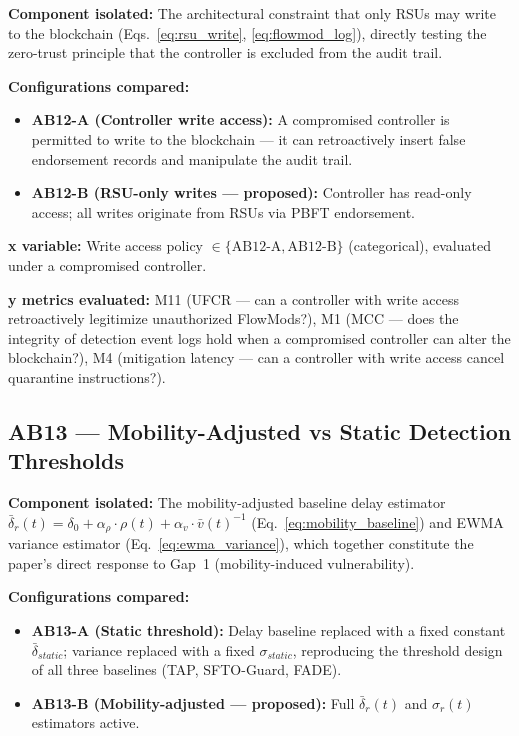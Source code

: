 \documentclass[12pt, a4paper]{report}
\begin{document}
{{\textbf{Component isolated:}
The architectural constraint that only \ac{RSU}s
may write to the blockchain
(Eqs.~\ref{eq:rsu_write}, \ref{eq:flowmod_log}),
directly testing the zero-trust principle that the
controller is excluded from the audit trail.

\textbf{Configurations compared:}
\begin{itemize}
    \item \textbf{AB12-A (Controller write access):}
    A compromised controller is permitted to write
    to the blockchain — it can retroactively insert
    false endorsement records and manipulate the
    audit trail.
    \item \textbf{AB12-B (RSU-only writes —
    proposed):} Controller has read-only access;
    all writes originate from \ac{RSU}s via
    \ac{PBFT} endorsement.
\end{itemize}

\textbf{x variable:} Write access policy
$\in \{\text{AB12-A}, \text{AB12-B}\}$ (categorical),
evaluated under a compromised controller.

\textbf{y metrics evaluated:} M11 (UFCR — can a
controller with write access retroactively legitimize
unauthorized FlowMods?), M1 (MCC — does the integrity
of detection event logs hold when a compromised
controller can alter the blockchain?), M4 (mitigation
latency — can a controller with write access cancel
quarantine instructions?).


\subsection{AB13 — Mobility-Adjusted vs Static
Detection Thresholds}
\label{sec:ab13}

\textbf{Component isolated:}
The mobility-adjusted baseline delay estimator
$\bar{\delta}_r(t) = \delta_0 + \alpha_\rho \cdot
\rho(t) + \alpha_v \cdot \bar{v}(t)^{-1}$
(Eq.~\ref{eq:mobility_baseline}) and \ac{EWMA}
variance estimator (Eq.~\ref{eq:ewma_variance}),
which together constitute the paper's direct
response to Gap~1 (mobility-induced vulnerability).

\textbf{Configurations compared:}
\begin{itemize}
    \item \textbf{AB13-A (Static threshold):}
    Delay baseline replaced with a fixed constant
    $\bar{\delta}_{static}$; variance replaced
    with a fixed $\sigma_{static}$, reproducing
    the threshold design of all three baselines
    (TAP, SFTO-Guard, FADE).
    \item \textbf{AB13-B (Mobility-adjusted —
    proposed):} Full $\bar{\delta}_r(t)$ and
    $\sigma_r(t)$ estimators active.
\end{itemize}

}}
\end{document}
